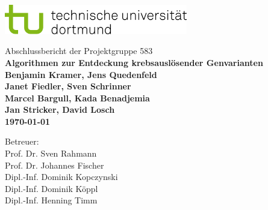 \begin{titlepage}
\vspace*{-2cm}
\newlength{\links}
\setlength{\links}{-1.5cm}
\sf
\LARGE

\hspace*{\links}
\begin{minipage}{12.5cm}
\includegraphics[width=8cm]{bilder/tud_logo_rgb}
\end{minipage}

\vspace*{4cm}

\hspace*{\links}
\hspace*{-0.2cm}
\begin{minipage}{9cm}
\large
\begin{center}
{\Large Abschlussbericht der Projektgruppe 583} \\
\vspace*{1cm}
\bf{ Algorithmen zur Entdeckung krebsauslösender Genvarianten } \\
\vspace*{1.5cm}
Benjamin Kramer, Jens Quedenfeld\\
Janet Fiedler, Sven Schrinner\\
Marcel Bargull, Kada Benadjemia\\
Jan Stricker, David Losch\\
\today
\end{center}
\end{minipage}

\vspace*{1.5cm}

\hspace*{\links}

\vspace*{1.5cm}

\vspace*{.6cm}

\hspace*{\links}
\begin{minipage}[b]{5cm}
\normalsize
\raggedright
Betreuer: \\
Prof. Dr. Sven Rahmann\\
Prof. Dr. Johannes Fischer\\
Dipl.-Inf. Dominik Kopczynski \\
Dipl.-Inf. Dominik Köppl\\
Dipl.-Inf. Henning Timm
\end{minipage}


\end{titlepage}
